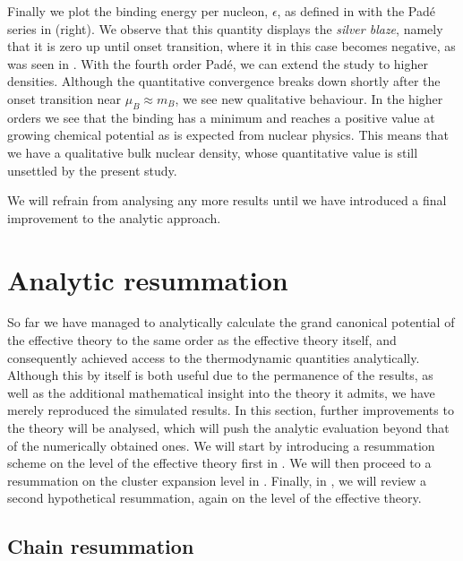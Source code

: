 Finally we plot the binding energy per nucleon, $\epsilon$, as defined
in  with the Pad\'e series in
 (right). We observe that this quantity displays the
\emph{silver blaze}, namely that it is zero up until onset transition, where it
in this case becomes negative, as was seen in \citep{Langelage:2014vpa}. With
the fourth order Pad\'e, we can extend the study to higher densities. Although
the quantitative convergence breaks down shortly after the onset transition near
$\mu_B \approx m_B$, we see new qualitative behaviour. In the higher orders we
see that the binding has a minimum and reaches a positive value at growing
chemical potential as is expected from nuclear physics. This means that we have
a qualitative bulk nuclear density, whose quantitative value is still unsettled
by the present study.

We will refrain from analysing any more results until we have introduced a final
improvement to the analytic approach.

\section{Analytic resummation} \label{sec:analytic_resummation}

So far we have managed to analytically calculate the grand canonical potential
of the effective theory to the same order as the effective theory itself, and
consequently achieved access to the thermodynamic quantities analytically.
Although this by itself is both useful due to the permanence of the results, as
well as the additional mathematical insight into the theory it admits, we have
merely reproduced the simulated results. In this section, further improvements to
the theory will be analysed, which will push the analytic evaluation beyond that
of the numerically obtained ones. We will start by introducing a resummation
scheme on the level of the effective theory first in
. We will then proceed to a resummation on the
cluster expansion level in . Finally, in
, we will review a second hypothetical
resummation, again on the level of the effective theory.

\subsection{Chain resummation} \label{sec:chain_resummation}

